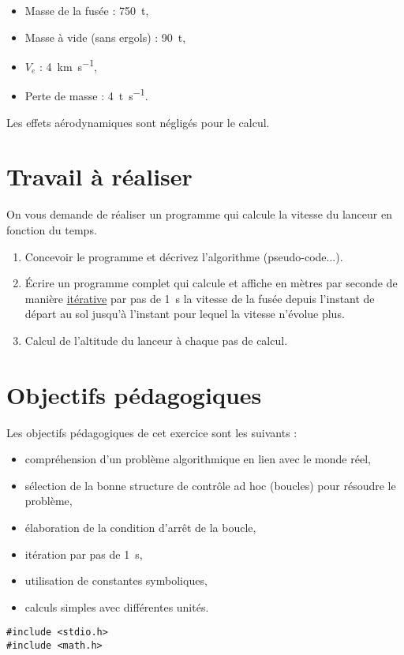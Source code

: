 \documentclass[french,a4paper,addpoints,11pt]{exam}
\begin{document}
\begin{questions}
\begin{multicols}{2}
        \begin{itemize}
            \item Masse de la fusée : \SI{750}{\tonne},
            \item Masse à vide (sans ergols) : \SI{90}{\tonne},
            \item $V_e$ : \SI{4}{\km\per\second},
            \item Perte de masse : \SI{4}{\tonne\per\second}.
        \end{itemize}

        Les effets aérodynamiques sont négligés pour le calcul.

        \section*{Travail à réaliser}

        On vous demande de réaliser un programme qui calcule la vitesse du lanceur en fonction du temps.

        \begin{enumerate}
            \item Concevoir le programme et décrivez l'algorithme (pseudo-code...).
            \item Écrire un programme complet qui calcule et affiche en mètres par seconde de manière \underline{itérative} par pas de \SI{1}{\second} la vitesse de la fusée depuis l'instant de départ au sol jusqu'à l'instant pour lequel la vitesse n'évolue plus.
            \item Calcul de l'altitude du lanceur à chaque pas de calcul.
        \end{enumerate}

        \section*{Objectifs pédagogiques}

        Les objectifs pédagogiques de cet exercice sont les suivants :

        \begin{itemize}
            \item compréhension d'un problème algorithmique en lien avec le monde réel,
            \item sélection de la bonne structure de contrôle ad hoc (boucles) pour résoudre le problème,
            \item élaboration de la condition d'arrêt de la boucle,
            \item itération par pas de \SI{1}{\second},
            \item utilisation de constantes symboliques,
            \item calculs simples avec différentes unités.
        \end{itemize}
    \end{multicols}
    \begin{solution}
    \begin{lstlisting}
#include <stdio.h>
#include <math.h>


\end{lstlisting}
\end{solution}
\end{questions}
\end{document}
